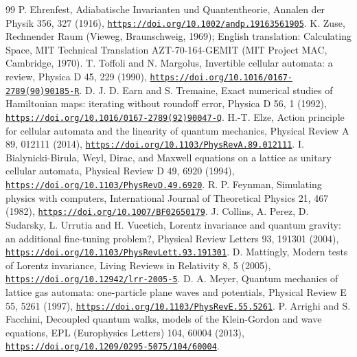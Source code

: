 \documentclass[pdflatex,sn-mathphys-num]{sn-jnl}
\theoremstyle{thmstyleone}
\theoremstyle{thmstyletwo}
\begin{document}
\begin{thebibliography}{99}
 P. Ehrenfest, Adiabatische Invarianten und Quantentheorie, Annalen der Physik 356, 327 (1916), \href{https://doi.org/10.1002/andp.19163561905}{\nolinkurl{https://doi.org/10.1002/andp.19163561905}}.
 K. Zuse, Rechnender Raum (Vieweg, Braunschweig, 1969); English translation: Calculating Space, MIT Technical Translation AZT-70-164-GEMIT (MIT Project MAC, Cambridge, 1970).
 T. Toffoli and N. Margolus, Invertible cellular automata: a review, Physica D 45, 229 (1990), \href{https://doi.org/10.1016/0167-2789(90)90185-R}{\nolinkurl{https://doi.org/10.1016/0167-2789(90)90185-R}}.
 D. J. D. Earn and S. Tremaine, Exact numerical studies of Hamiltonian maps: iterating without roundoff error, Physica D 56, 1 (1992), \href{https://doi.org/10.1016/0167-2789(92)90047-Q}{\nolinkurl{https://doi.org/10.1016/0167-2789(92)90047-Q}}.
 H.-T. Elze, Action principle for cellular automata and the linearity of quantum mechanics, Physical Review A 89, 012111 (2014), \href{https://doi.org/10.1103/PhysRevA.89.012111}{\nolinkurl{https://doi.org/10.1103/PhysRevA.89.012111}}.
 I. Bialynicki-Birula, Weyl, Dirac, and Maxwell equations on a lattice as unitary cellular automata, Physical Review D 49, 6920 (1994), \href{https://doi.org/10.1103/PhysRevD.49.6920}{\nolinkurl{https://doi.org/10.1103/PhysRevD.49.6920}}.
 R. P. Feynman, Simulating physics with computers, International Journal of Theoretical Physics 21, 467 (1982), \href{https://doi.org/10.1007/BF02650179}{\nolinkurl{https://doi.org/10.1007/BF02650179}}.
 J. Collins, A. Perez, D. Sudarsky, L. Urrutia and H. Vucetich, Lorentz invariance and quantum gravity: an additional fine-tuning problem?, Physical Review Letters 93, 191301 (2004), \href{https://doi.org/10.1103/PhysRevLett.93.191301}{\nolinkurl{https://doi.org/10.1103/PhysRevLett.93.191301}}.
 D. Mattingly, Modern tests of Lorentz invariance, Living Reviews in Relativity 8, 5 (2005), \href{https://doi.org/10.12942/lrr-2005-5}{\nolinkurl{https://doi.org/10.12942/lrr-2005-5}}.
 D. A. Meyer, Quantum mechanics of lattice gas automata: one-particle plane waves and potentials, Physical Review E 55, 5261 (1997), \href{https://doi.org/10.1103/PhysRevE.55.5261}{\nolinkurl{https://doi.org/10.1103/PhysRevE.55.5261}}.
 P. Arrighi and S. Facchini, Decoupled quantum walks, models of the Klein-Gordon and wave equations, EPL (Europhysics Letters) 104, 60004 (2013), \href{https://doi.org/10.1209/0295-5075/104/60004}{\nolinkurl{https://doi.org/10.1209/0295-5075/104/60004}}.

\end{thebibliography}
\end{document}
